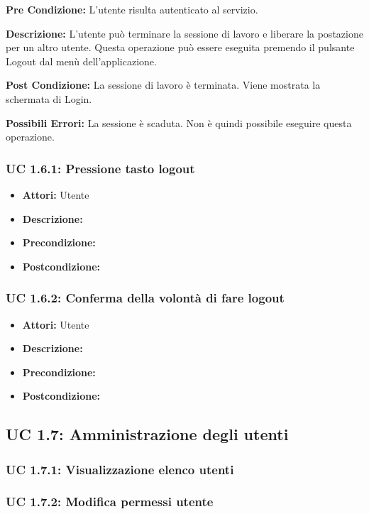 \textbf{Pre Condizione:}
L'utente risulta autenticato al servizio.

\textbf{Descrizione:}
L'utente può terminare la sessione di lavoro e liberare la postazione per un altro utente.
Questa operazione può essere eseguita premendo il pulsante Logout dal menù dell'applicazione.

\textbf{Post Condizione:}
La sessione di lavoro è terminata. Viene mostrata la schermata di Login.

\textbf{Possibili Errori:}
La sessione è scaduta. Non è quindi possibile eseguire questa operazione.

\subsubsection{UC 1.6.1: Pressione tasto logout}

\begin{itemize}
\item \textbf{Attori:} Utente
\item \textbf{Descrizione:} 
\item \textbf{Precondizione:} 
\item \textbf{Postcondizione:} 
\end{itemize}

\subsubsection{UC 1.6.2: Conferma della volontà di fare logout}

\begin{itemize}
\item \textbf{Attori:} Utente
\item \textbf{Descrizione:} 
\item \textbf{Precondizione:} 
\item \textbf{Postcondizione:} 
\end{itemize}



\subsection{UC 1.7: Amministrazione degli utenti}
\subsubsection{UC 1.7.1: Visualizzazione elenco utenti}
\subsubsection{UC 1.7.2: Modifica permessi utente}
